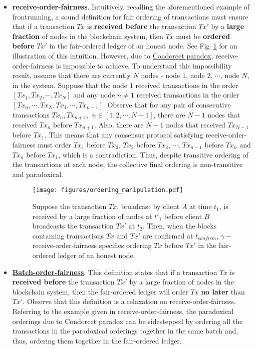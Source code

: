 \documentclass{article}
\begin{document}
\begin{itemize}
    \item \textbf{receive-order-fairness}. Intuitively, recalling the aforementioned example of frontrunning, a sound definition for fair ordering of transactions must ensure that if a transaction $Tx$ is \textbf{received before} the transaction $Tx'$ by a \textbf{large fraction} of nodes in the blockchain system, then $Tx$ must be \textbf{ordered before} $Tx'$ in the fair-ordered ledger of an honest node. See Fig~\ref{fig:gamma-receive-order-fairness} for an illustration of this intuition. However, due to \href{https://en.wikipedia.org/wiki/Condorcet_paradox}{Condorcet paradox}, receive-order-fairness is impossible to achieve. To understand this impossibility result, assume that there are currently $N$ nodes -  node $1$, node $2$, $\cdots$, node $N$, in the system. Suppose that the node $1$ received transactions in the order $[Tx_1, Tx_2, \cdots, Tx_N]$ and any node $n \neq 1$ received transactions in the order  $[Tx_n, \cdots, Tx_N, Tx_1, \cdots, Tx_{n-1}]$. Observe that for any pair of consecutive transactions $Tx_n, Tx_{n+1},$ $n \in [1, 2, \cdots, N-1]$, there are $N-1$ nodes that received $Tx_n$ before $Tx_{n+1}$. Also, there are $N-1$ nodes that received $Tx_{N-1}$ before $Tx_1$. This means that any consensus protocol satisfying receive-order-fairness must order $Tx_1$ before $Tx_2$, $Tx_2$ before $Tx_3$, $\cdots$, $Tx_{n-1}$ before $Tx_n$ and $Tx_n$ before $Tx_1$, which is a contradiction. Thus, despite transitive ordering of the transactions at each node, the collective final ordering is non-transitive and paradoxical.   
\begin{figure}
    \centering
    \texttt{[image: figures/ordering\_manipulation.pdf]}
    \caption{Suppose the transaction $Tx$, broadcast by client $A$ at time $t_1$, is received by a large fraction of nodes at $t'_1$ before client $B$ broadcasts the transaction $Tx'$ at $t_2$. Then, when the blocks containing transactions $Tx$ and $Tx'$ are confirmed at $t_{confirm}$, $\gamma-$receive-order-fairness specifies ordering $Tx$ before $Tx'$ in the fair-ordered ledger of an honest node.}
    \label{fig:gamma-receive-order-fairness}
\end{figure}
    \item \textbf{\href{https://link.springer.com/chapter/10.1007/978-3-030-56877-1_16}{Batch-order-fairness}}. This definition states that if a transaction $Tx$ is \textbf{received before} the transaction $Tx'$ by a large fraction of nodes in the blockchain system,  then the fair-ordered ledger will order $Tx$ \textbf{no later} than $Tx'$. Observe that this definition is a relaxation on receive-order-fairness. Referring to the example given in receive-order-fairness, the paradoxical orderings due to Condorcet paradox can be sidestepped by ordering all the transactions in the paradoxical orderings together in the same batch and, thus, ordering them together in the fair-ordered ledger. 

\end{itemize}
\end{document}
